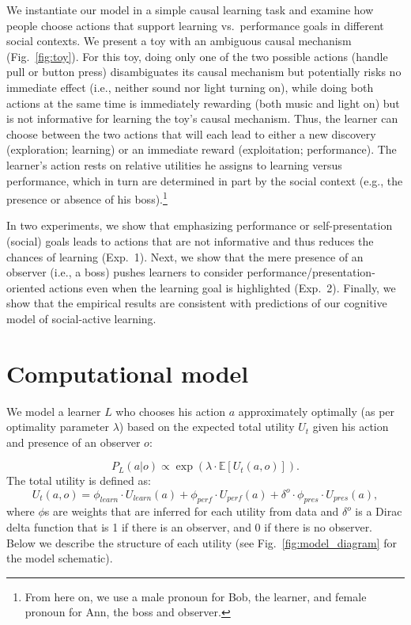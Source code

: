 \documentclass[10pt, letterpaper]{article}
\begin{document}
We instantiate our model in a simple causal learning task and examine
how people choose actions that support learning vs.~performance goals in
different social contexts. We present a toy with an ambiguous causal
mechanism (Fig.~\ref{fig:toy}). For this toy, doing only one of the two
possible actions (handle pull or button press) disambiguates its causal
mechanism but potentially risks no immediate effect (i.e., neither sound
nor light turning on), while doing both actions at the same time is
immediately rewarding (both music and light on) but is not informative
for learning the toy's causal mechanism. Thus, the learner can choose
between the two actions that will each lead to either a new discovery
(exploration; learning) or an immediate reward (exploitation;
performance). The learner's action rests on relative utilities he
assigns to learning versus performance, which in turn are determined in
part by the social context (e.g., the presence or absence of his
boss).\footnote{From here on, we use a male pronoun for Bob, the learner, and female pronoun for Ann, the boss and observer.}

In two experiments, we show that emphasizing performance or
self-presentation (social) goals leads to actions that are not
informative and thus reduces the chances of learning (Exp.~1). Next, we
show that the mere presence of an observer (i.e., a boss) pushes
learners to consider performance/presentation-oriented actions even when
the learning goal is highlighted (Exp.~2). Finally, we show that the
empirical results are consistent with predictions of our cognitive model
of social-active learning.

\section{Computational model}\label{computational-model}

We model a learner \(L\) who chooses his action \(a\) approximately
optimally (as per optimality parameter \(\lambda\)) based on the
expected total utility \(U_{t}\) given his action and presence of an
observer \(o\):

\[ P_L(a | o) \propto \exp(\lambda \cdot \mathbb{E}[U_{t}(a,o)]).\]
\noindent
The total utility is defined as:
\[U_{t}(a,o) = \phi_{learn} \cdot U_{learn}(a) + \phi_{perf} \cdot U_{perf}(a) + \delta^o \cdot \phi_{pres} \cdot U_{pres}(a),\]
\noindent
where \(\phi\)s are weights that are inferred for each utility from data
and \(\delta^o\) is a Dirac delta function that is 1 if there is an
observer, and 0 if there is no observer. Below we describe the structure
of each utility (see Fig.~\ref{fig:model_diagram} for the model
schematic).
\end{document}
